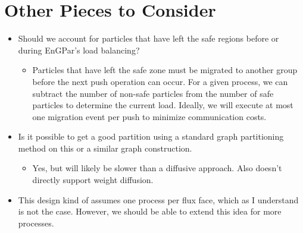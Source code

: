 \documentclass[a4paper]{article}
\begin{document}
\section{Other Pieces to Consider}
\begin{itemize}
\item Should we account for particles that have left the safe regions before or during EnGPar's load balancing?
  {\color{red}
    \begin{itemize}
    \item Particles that have left the safe zone must be migrated to another group before the next push operation can occur. For a given process, we can subtract the number of non-safe particles from the number of safe particles to determine the current load. Ideally, we will execute at most one migration event per push to minimize communication costs.
    \end{itemize}
  }
\item Is it possible to get a good partition using a standard graph partitioning method on this or a similar graph construction.
  {\color{red}
    \begin{itemize}
    \item Yes, but will likely be slower than a diffusive approach. Also doesn't directly support weight diffusion.
    \end{itemize}
  }

  \item This design kind of assumes one process per flux face, which as I understand is not the case. However, we should be able to extend this idea for more processes.
\end{itemize}
\end{document}
